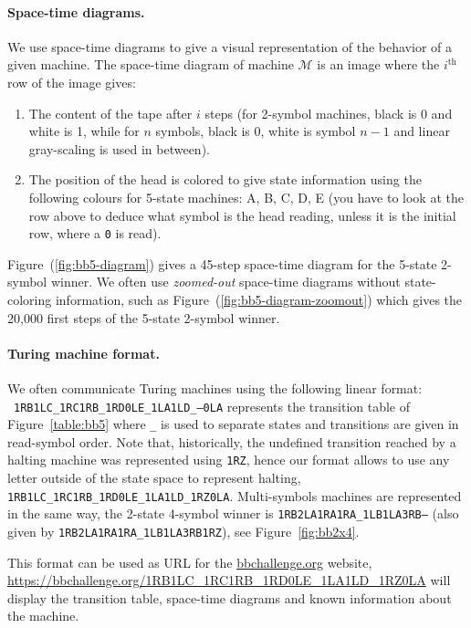 \documentclass[a4paper,british]{article}
\theoremstyle{definition} %
\numberwithin{equation}{section}
\theoremstyle{definition} %
\newcommand{\szero}{\texttt{0}\xspace}
\begin{document}
\paragraph*{Space-time diagrams.} We use space-time diagrams to give a visual representation of the behavior of a given machine. The space-time diagram of machine $\mathcal{M}$ is an image where the $i^\text{th}$ row of the image gives:
\begin{enumerate}
    \item The content of the tape after $i$ steps (for 2-symbol machines, black is 0 and white is 1, while for $n$ symbols, black is 0, white is symbol $n-1$ and linear gray-scaling is used in between).
    \item The position of the head is colored to give state information using the following colours for 5-state machines: \textcolor{colorA}{A},  \textcolor{colorB}{B},  \textcolor{colorC}{C},  \textcolor{colorD}{D},  \textcolor{colorE}{E} (you have to look at the row above to deduce what symbol is the head reading, unless it is the initial row, where a \szero is read).
\end{enumerate}

Figure~(\ref{fig:bb5-diagram}) gives a 45-step space-time diagram for the 5-state 2-symbol \BBfull winner. We often use \textit{zoomed-out} space-time diagrams without state-coloring information, such as Figure~(\ref{fig:bb5-diagram-zoomout}) which gives the 20,000 first steps of the 5-state 2-symbol \BBfull winner.


\paragraph*{Turing machine format.} We often communicate Turing machines using the following linear format: \\ \texttt{1RB1LC\_1RC1RB\_1RD0LE\_1LA1LD\_---0LA} represents the transition table of Figure~\ref{table:bb5} where \texttt{\_} is used to separate states and transitions are given in read-symbol order. Note that, historically, the undefined transition reached by a halting machine was represented using \texttt{1RZ}, hence our format allows to use any letter outside of the state space to represent halting, \eg \texttt{1RB1LC\_1RC1RB\_1RD0LE\_1LA1LD\_1RZ0LA}. Multi-symbols machines are represented in the same way, \eg the 2-state 4-symbol \BBfull winner is \texttt{1RB2LA1RA1RA\_1LB1LA3RB---} (also given by \texttt{1RB2LA1RA1RA\_1LB1LA3RB1RZ}), see Figure~\ref{fig:bb2x4}.

This format can be used as URL for the \url{bbchallenge.org} website, \eg \url{https://bbchallenge.org/1RB1LC\_1RC1RB\_1RD0LE\_1LA1LD\_1RZ0LA} will display the transition table, space-time diagrams and known information about the machine.
\end{document}
